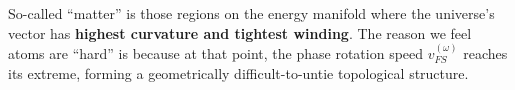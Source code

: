 So-called ``matter'' is those regions on the energy manifold where the universe's vector has \textbf{highest curvature and tightest winding}. The reason we feel atoms are ``hard'' is because at that point, the phase rotation speed $v_{FS}^{(\omega)}$ reaches its extreme, forming a geometrically difficult-to-untie topological structure.

